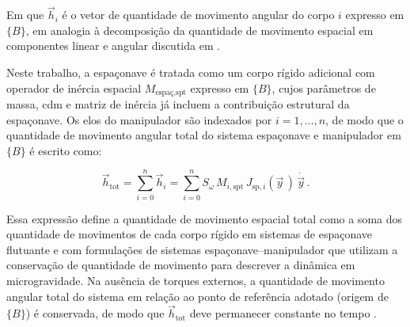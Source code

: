 Em que $\vec h_i$ é o vetor de quantidade de movimento angular do corpo $i$ expresso em $\{B\}$,
em analogia à decomposição da quantidade de movimento espacial em componentes linear e angular discutida em
\cite{featherstone2008,lynch2017modern}.

Neste trabalho, a espaçonave é tratada como um corpo rígido adicional com operador de inércia espacial
$M_{\text{espaç},\text{spt}}$ expresso em $\{B\}$,
cujos parâmetros de massa, \gls{cdm} e matriz de inércia já incluem
a contribuição estrutural da espaçonave.
Os elos do manipulador são indexados por $i=1,\dots,n$, de modo que o
quantidade de movimento angular total do sistema espaçonave e manipulador em $\{B\}$ é escrito como:

\begin{equation}
\vec h_{\text{tot}}
=
\sum_{i=0}^{n} \vec h_i
=
\sum_{i=0}^{n}
S_\omega\,M_{i,\text{spt}}\,
J_{\text{sp},i}(\vec y\,)\,\dot{\vec y\,}.
\label{eq_quantidade_mov_angular_total}
\end{equation}


Essa expressão define a quantidade de movimento espacial total como a soma dos quantidade de movimentos de cada corpo rígido
em sistemas de espaçonave flutuante \cite{featherstone2008} e com formulações de sistemas espaçonave--manipulador
que utilizam a conservação de quantidade de movimento para descrever a dinâmica em
microgravidade.
Na ausência de torques externos, a quantidade de movimento angular total do sistema em relação
ao ponto de referência adotado (origem de $\{B\}$) é conservada, de modo que $\vec h_{\text{tot}}$
deve permanecer constante no tempo \cite{wie2008space,featherstone2008}.
